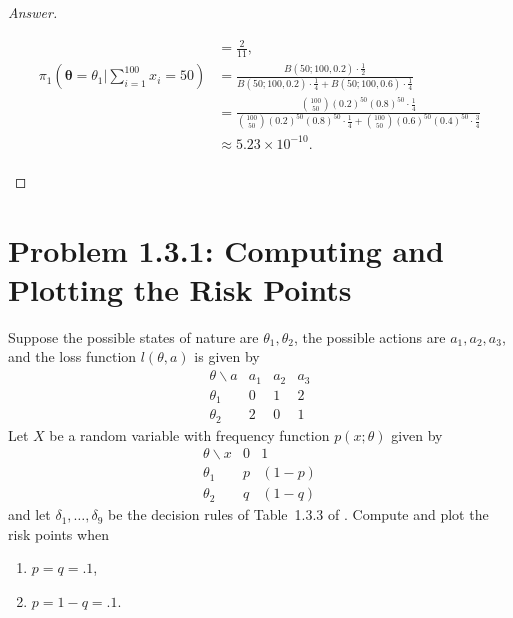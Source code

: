 \documentclass{amsbook}
\theoremstyle{definition}
\theoremstyle{remark}
\numberwithin{section}{chapter}
\numberwithin{equation}{chapter}
\begin{document}
\begin{proof}[Answer]
\begin{enumerate}[label=(\alph*)]
\[\begin{split}
&=\frac{2}{11},\\
\pi_1(\bm{\theta}=\theta_1|\sum_{i=1}^{100}x_i=50)&=\frac{B(50;100,0.2)\cdot\frac{1}{2}}{B(50;100,0.2)\cdot\frac{1}{4} + B(50;100,0.6)\cdot\frac{1}{4}}\\
&=\frac{\binom{100}{50}(0.2)^{50}(0.8)^{50}\cdot\frac{1}{4}}{\binom{100}{50}(0.2)^{50}(0.8)^{50}\cdot\frac{1}{4} + \binom{100}{50}(0.6)^{50}(0.4)^{50}\cdot\frac{3}{4}}\\
&\approx5.23\times10^{-10}.\\
\end{split}
\]
\end{enumerate}
\end{proof}

\section{Problem 1.3.1: Computing and Plotting the Risk Points}
Suppose the possible states of nature are $\theta_1,\theta_2$, the possible actions are $a_1,a_2,a_3$, and the loss function $l(\theta,a)$ is given by\[
\begin{array}{c|c|c|c}
\theta\backslash a&a_1&a_2&a_3\\\hline
\theta_1&0&1&2\\\hline
\theta_2&2&0&1
\end{array}
\]Let $X$ be a random variable with frequency function $p(x;\theta)$ given by\[
\begin{array}{c|c|c}
\theta\backslash x&0&1\\\hline
\theta_1&p&(1-p)\\\hline
\theta_2&q&(1-q)
\end{array}
\]and let $\delta_1,\dots,\delta_9$ be the decision rules of Table~1.3.3 of \cite{bickel2015mathematical}. Compute and plot the risk points when
\begin{enumerate}[label=(\alph*)]
\item $p=q=.1$,
\item $p=1-q=.1$.
\end{enumerate}
\end{document}
